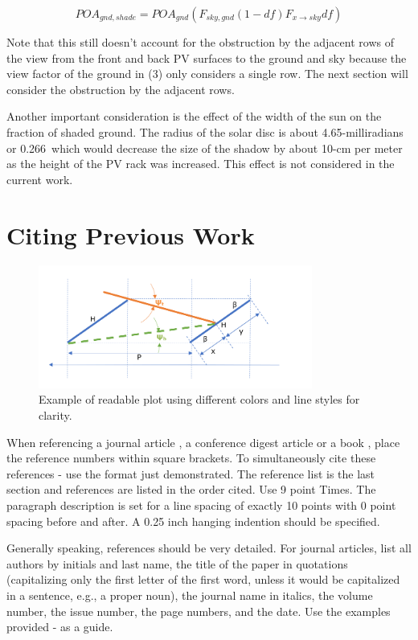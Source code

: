 \documentclass[conference]{IEEEtran}
\begin{document}
\begin{equation}
POA_{gnd,shade} = POA_{gnd}\left(F_{sky,gnd} \left(1-df \right)F_{x \rightarrow sky} df\right)
\end{equation}

Note that this still doesn’t account for the obstruction by the adjacent rows of the view from the front and back PV surfaces to the ground and sky because the view factor of the ground in (3) only considers a single row. The next section will consider the obstruction by the adjacent rows.

Another important consideration is the effect of the width of the sun on the fraction of shaded ground. The radius of the solar disc is about 4.65-milliradians or 0.266\degree\ which would decrease the size of the shadow by about 10-cm per meter as the height of the PV rack was increased. This effect is not considered in the current work.

\section{Citing Previous Work}

\begin{figure}
\centering
\includegraphics[width=9cm]{next-row-view-factor-angles.png}
\caption{Example of readable plot using different colors and line styles for clarity.}
\end{figure}

When referencing a journal article \cite{Mikofski_8547323}, a conference
digest article \cite{Mikofski_8547323} or a book \cite{Mikofski_8547323}, place the reference numbers within square
brackets. To simultaneously cite these references \cite{Mikofski_8547323} - \cite{Mikofski_8547323} use the format just demonstrated. The reference list is the last section and references are listed in the order cited. Use 9 point Times. The paragraph description is set for a line spacing of exactly 10 points with 0 point spacing before and after. A 0.25 inch hanging indention should be specified. 

Generally speaking, references should be very detailed. For journal articles, list all authors by initials and last name, the title of the paper in quotations (capitalizing only the first letter of the first word, unless it would be capitalized in a sentence, e.g., a proper noun), the journal name in italics, the volume number, the issue number, the page numbers, and the date. Use the examples provided \cite{Mikofski_8547323} - \cite{Mikofski_8547323} as a guide. 
\end{document}
